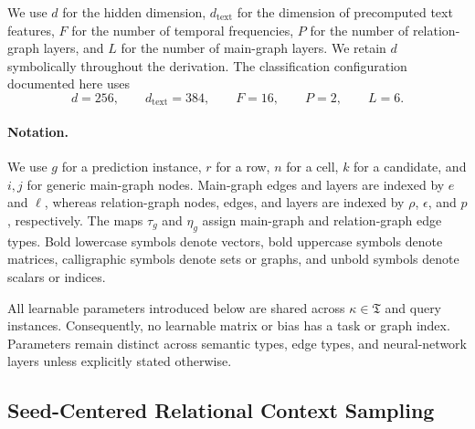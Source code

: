 \documentclass[11pt]{article}
\begin{document}
We use \(d\) for the hidden dimension, \(d_{\mathrm{text}}\) for the
dimension of precomputed text features, \(F\) for the number of temporal
frequencies, \(P\) for the number of relation-graph layers, and \(L\) for the
number of main-graph layers.  We retain \(d\) symbolically throughout the
derivation.  The classification configuration documented here uses
\begin{equation}
    d=256,
    \qquad
    d_{\mathrm{text}}=384,
    \qquad
    F=16,
    \qquad
    P=2,
    \qquad
    L=6.
    \label{eq:model-dimensions}
\end{equation}

\paragraph{Notation.}
We use \(g\) for a prediction instance, \(r\) for a row, \(n\) for a cell,
\(k\) for a candidate, and \(i,j\) for generic main-graph nodes.  Main-graph
edges and layers are indexed by \(e\) and \(\ell\), whereas relation-graph
nodes, edges, and layers are indexed by \(\rho\), \(\epsilon\), and \(p\),
respectively.  The maps \(\tau_g\) and \(\eta_g\) assign main-graph and
relation-graph edge types.  Bold lowercase symbols denote vectors, bold
uppercase symbols denote matrices, calligraphic symbols denote sets or
graphs, and unbold symbols denote scalars or indices.

All learnable parameters introduced below are shared across
\(\kappa\in\mathfrak T\) and query instances.  Consequently, no learnable matrix or bias has a
task or graph index.  Parameters remain distinct across semantic types,
edge types, and neural-network layers unless explicitly stated otherwise.


\subsection{Seed-Centered Relational Context Sampling}
\label{sec:context-sampling}
\end{document}
